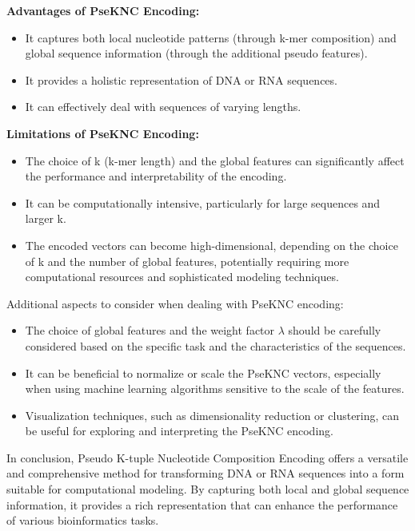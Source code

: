 \noindent
\textbf{Advantages of PseKNC Encoding:}
\begin{itemize}
  \item It captures both local nucleotide patterns (through k-mer composition) 
  and global sequence information (through the additional pseudo features).
  \item It provides a holistic representation of DNA or RNA sequences.
  \item It can effectively deal with sequences of varying lengths.
\end{itemize}

\noindent
\textbf{Limitations of PseKNC Encoding:}
\begin{itemize}
  \item The choice of k (k-mer length) and the global features can significantly 
  affect the performance and interpretability of the encoding.
  \item It can be computationally intensive, particularly for large sequences and 
  larger k.
  \item The encoded vectors can become high-dimensional, depending on the choice 
  of k and the number of global features, potentially requiring more computational resources and sophisticated modeling techniques.
\end{itemize}

\noindent
Additional aspects to consider when dealing with PseKNC encoding:

\begin{itemize}
  \item The choice of global features and the weight factor $\lambda$ should be 
  carefully considered based on the specific task and the characteristics of the 
  sequences.
  \item It can be beneficial to normalize or scale the PseKNC vectors, especially 
  when using machine learning algorithms sensitive to the scale of the features.
  \item Visualization techniques, such as dimensionality reduction or clustering, 
  can be useful for exploring and interpreting the PseKNC encoding.
\end{itemize}

\noindent
In conclusion, Pseudo K-tuple Nucleotide Composition Encoding offers a versatile
and comprehensive method for transforming DNA or RNA sequences into a form
suitable for computational modeling. By capturing both local and global sequence
information, it provides a rich representation that can enhance the performance
of various bioinformatics tasks.
